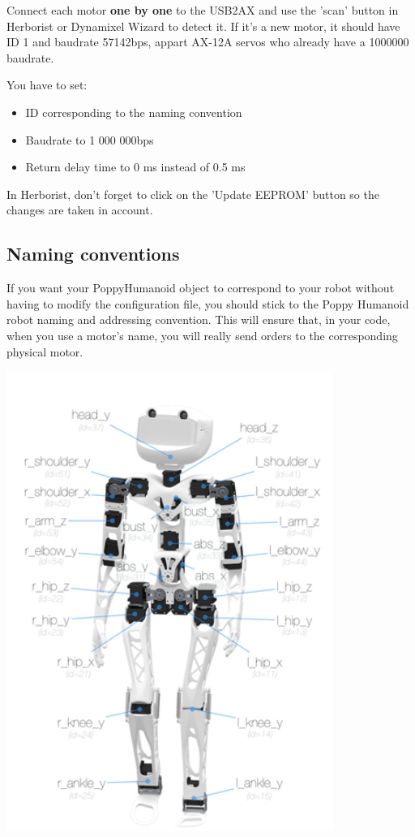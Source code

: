 \documentclass{article}
\begin{document}
 Connect each motor \textbf{one by one} to the USB2AX and use the 'scan' button in Herborist or Dynamixel Wizard to detect it. If it's a new motor, it should have ID 1 and baudrate 57142bps, appart AX-12A servos who already have a 1000000 baudrate.

You have to set:
\begin{itemize}
\item ID corresponding to the naming convention
\item Baudrate to 1 000 000bps
\item Return delay time to 0 ms instead of 0.5 ms
\end{itemize}

In Herborist, don't forget to click on the 'Update EEPROM' button so the changes are taken in account.


\subsection{Naming conventions}

If you want your PoppyHumanoid object to correspond to your robot without having to modify the configuration file, you should stick to the Poppy Humanoid robot naming and addressing convention. This will ensure that, in your code, when you use a motor's name, you will really send orders to the corresponding physical motor.
\begin{center}
  \includegraphics[width=0.8\textwidth]{img/motor_naming_convention}
 \end{center}
 
\end{document}
